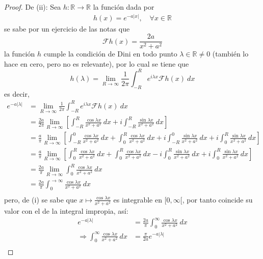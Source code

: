 \documentclass[12pt]{report}
\newcounter{it}
\theoremstyle{largebreak}
\newcommand\abs[1]{\ensuremath{\left|#1\right|}}
\newcommand\cf[3]{\ensuremath{#1:#2\rightarrow#3}}
\newcommand{\fou}[1]{\ensuremath{\mathcal{F}#1}}
\begin{document}
\begin{proof}
        De (ii): Sea $\cf{h}{\mathbb{R}}{\mathbb{R}}$ la función dada por
        \begin{equation*}
            \begin{split}
                h(x)=e^{-a\abs{x}},\quad\forall x\in\mathbb{R}
            \end{split}
        \end{equation*}
        se sabe por un ejercicio de las notas que
        \begin{equation*}
            \fou{h}(x)=\frac{2a}{x^2+a^2}
        \end{equation*}
        la función $h$ cumple la condición de Dini en todo punto $\lambda\in\mathbb{R}\neq0$ (también lo hace en cero, pero no es relevante), por lo cual se tiene que
        \begin{equation*}
            h(\lambda)=\lim_{ R\rightarrow\infty}\frac{1}{2\pi}\int_{ -R}^R e^{ i\lambda x}\fou{h}(x)\:dx
        \end{equation*}
        es decir,
        \begin{equation*}
            \begin{split}
                e^{ -a\abs{\lambda}}&=\lim_{ R\rightarrow\infty}\frac{1}{2\pi}\int_{ -R}^R e^{ i\lambda x}\fou{h}(x)\:dx\\
                &=\frac{2a}{2\pi}\lim_{ R\rightarrow\infty}\left[\int_{ -R}^R\frac{\cos\lambda x}{x^2+a^2}\:dx+i\int_{ -R}^R\frac{\sin\lambda x}{x^2+a^2}\:dx \right] \\
                &=\frac{a}{\pi}\lim_{ R\rightarrow\infty}\left[\int_{ -R}^0\frac{\cos\lambda x}{x^2+a^2}\:dx+\int_{0}^R\frac{\cos\lambda x}{x^2+a^2}\:dx+i\int_{ -R}^0\frac{\sin\lambda x}{x^2+a^2}\:dx+i\int_{0}^R\frac{\sin\lambda x}{x^2+a^2}\:dx \right]\\
                &=\frac{a}{\pi}\lim_{ R\rightarrow\infty}\left[\int_{0}^R\frac{\cos\lambda x}{x^2+a^2}\:dx+\int_{0}^R\frac{\cos\lambda x}{x^2+a^2}\:dx-i\int_{0}^R\frac{\sin\lambda x}{x^2+a^2}\:dx+i\int_{0}^R\frac{\sin\lambda x}{x^2+a^2}\:dx\right]\\
                &=\frac{2a}{\pi}\lim_{ R\rightarrow\infty}\int_{0}^R\frac{\cos\lambda x}{x^2+a^2}\:dx\\
                &=\frac{2a}{\pi}\int_{0}^{\rightarrow\infty}\frac{\cos\lambda x}{x^2+a^2}\:dx\\
            \end{split}
        \end{equation*}
        pero, de (i) se sabe que $x\mapsto\frac{\cos\lambda x}{x^2+a^2}$ es integrable en $[0,\infty[$, por tanto coincide su valor con el de la integral impropia, así:
        \begin{equation*}
            \begin{split}
                e^{ -a\abs{\lambda}}&=\frac{2a}{\pi}\int_{0}^{\infty}\frac{\cos\lambda x}{x^2+a^2}\:dx\\
                \Rightarrow \int_{0}^{\infty}\frac{\cos\lambda x}{x^2+a^2}\:dx&=\frac{\pi}{2a}e^{ -a\abs{\lambda}}\\
            \end{split}
        \end{equation*}


\end{proof}
\end{document}
